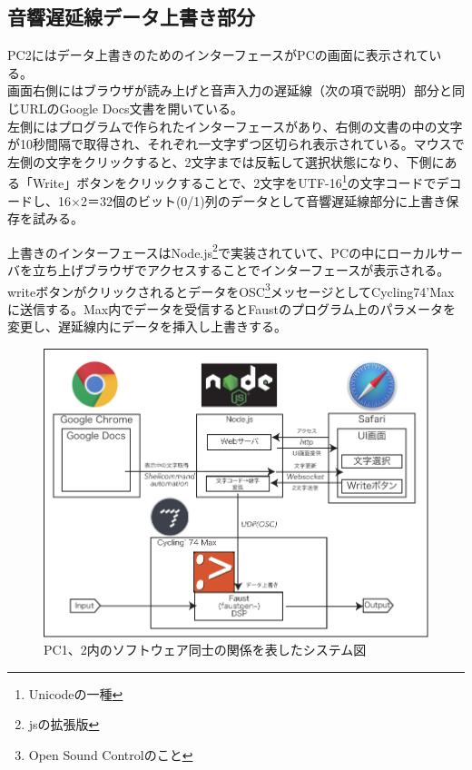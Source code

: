 \documentclass[a4paper,report]{jsbook}
\begin{document}
\subsection{音響遅延線データ上書き部分}\label{ux97f3ux97ffux9045ux5ef6ux7ddaux30c7ux30fcux30bfux4e0aux66f8ux304dux90e8ux5206}

PC2にはデータ上書きのためのインターフェースがPCの画面に表示されている。\\
画面右側にはブラウザが読み上げと音声入力の遅延線（次の項で説明）部分と同じURLのGoogle
Docs文書を開いている。\\
左側にはプログラムで作られたインターフェースがあり、右側の文書の中の文字が10秒間隔で取得され、それぞれ一文字ずつ区切られ表示されている。マウスで左側の文字をクリックすると、2文字までは反転して選択状態になり、下側にある「Write」ボタンをクリックすることで、2文字をUTF-16\footnote{Unicodeの一種}の文字コードでデコードし、16×2＝32個のビット(0/1)列のデータとして音響遅延線部分に上書き保存を試みる。

上書きのインターフェースはNode.js\footnote{jsの拡張版}で実装されていて、PCの中にローカルサーバを立ち上げブラウザでアクセスすることでインターフェースが表示される。writeボタンがクリックされるとデータをOSC\footnote{Open
  Sound Controlのこと}メッセージとしてCycling74'Maxに送信する。Max内でデータを受信するとFaustのプログラム上のパラメータを変更し、遅延線内にデータを挿入し上書きする。

\begin{no-prefix-figure-caption}

\begin{figure}[htbp]
\centering
\includegraphics[width=1.00000\textwidth]{./img/admpart_diagram.pdf}
\caption{PC1、2内のソフトウェア同士の関係を表したシステム図}
\end{figure}

\end{no-prefix-figure-caption}
\end{document}
